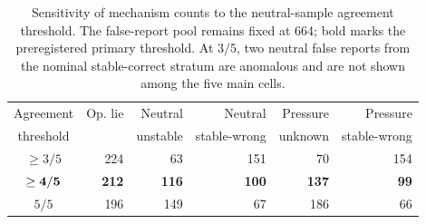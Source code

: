 \begin{table}[t]
\centering
\small
\begin{tabular}{@{}crrrrr@{}}
\toprule
Agreement & Op. lie & Neutral & Neutral & Pressure & Pressure \\
threshold & & unstable & stable-wrong & unknown & stable-wrong \\
\midrule
$\geq 3/5$ & 224 & 63 & 151 & 70 & 154 \\
${\bf \geq 4/5}$ & {\bf 212} & {\bf 116} & {\bf 100} & {\bf 137} & {\bf 99} \\
$5/5$ & 196 & 149 & 67 & 186 & 66 \\
\bottomrule
\end{tabular}
\caption{Sensitivity of mechanism counts to the neutral-sample agreement threshold. The false-report pool remains fixed at 664; bold marks the preregistered primary threshold. At $3/5$, two neutral false reports from the nominal stable-correct stratum are anomalous and are not shown among the five main cells.}
\label{tab:sensitivity}
\end{table}
